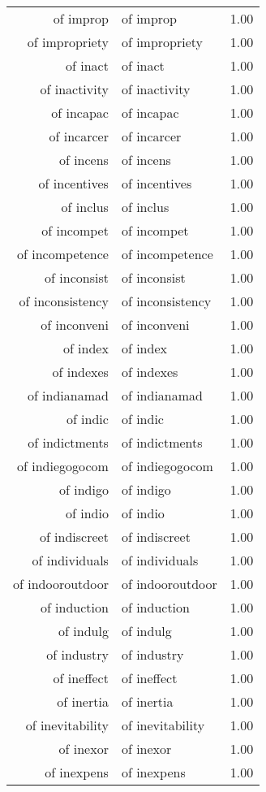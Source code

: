 \begin{table}[ht]
\begin{tabular}{rlr}
  of improp & of improp & 1.00 \\ 
  of impropriety & of impropriety & 1.00 \\ 
  of inact & of inact & 1.00 \\ 
  of inactivity & of inactivity & 1.00 \\ 
  of incapac & of incapac & 1.00 \\ 
  of incarcer & of incarcer & 1.00 \\ 
  of incens & of incens & 1.00 \\ 
  of incentives & of incentives & 1.00 \\ 
  of inclus & of inclus & 1.00 \\ 
  of incompet & of incompet & 1.00 \\ 
  of incompetence & of incompetence & 1.00 \\ 
  of inconsist & of inconsist & 1.00 \\ 
  of inconsistency & of inconsistency & 1.00 \\ 
  of inconveni & of inconveni & 1.00 \\ 
  of index & of index & 1.00 \\ 
  of indexes & of indexes & 1.00 \\ 
  of indianamad & of indianamad & 1.00 \\ 
  of indic & of indic & 1.00 \\ 
  of indictments & of indictments & 1.00 \\ 
  of indiegogocom & of indiegogocom & 1.00 \\ 
  of indigo & of indigo & 1.00 \\ 
  of indio & of indio & 1.00 \\ 
  of indiscreet & of indiscreet & 1.00 \\ 
  of individuals & of individuals & 1.00 \\ 
  of indooroutdoor & of indooroutdoor & 1.00 \\ 
  of induction & of induction & 1.00 \\ 
  of indulg & of indulg & 1.00 \\ 
  of industry & of industry & 1.00 \\ 
  of ineffect & of ineffect & 1.00 \\ 
  of inertia & of inertia & 1.00 \\ 
  of inevitability & of inevitability & 1.00 \\ 
  of inexor & of inexor & 1.00 \\ 
  of inexpens & of inexpens & 1.00 \\ 

\end{tabular}
\end{table}
